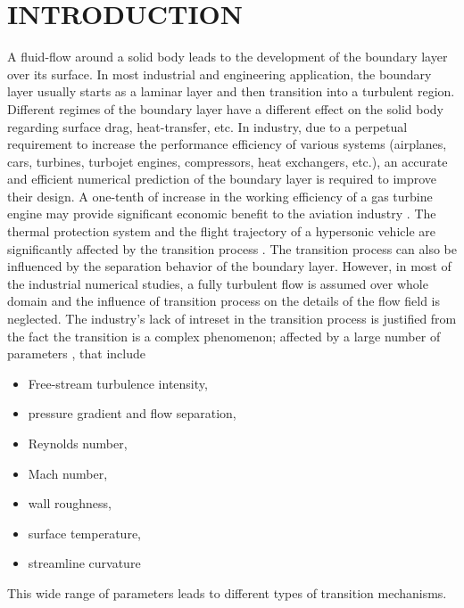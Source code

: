 
\chapter{INTRODUCTION}
\label{chap:intro}
A fluid-flow around a solid body leads to the development of the boundary layer over its surface.
In most industrial and engineering application, the boundary layer usually starts as a laminar layer and then transition into a turbulent region.
Different regimes of the boundary layer have a different effect on the solid body regarding surface drag, heat-transfer, etc. 
In industry, due to a perpetual requirement to increase the performance efficiency of various systems (airplanes, cars, turbines, turbojet engines, compressors, heat exchangers, etc.), an accurate and efficient numerical prediction of the boundary layer is required to improve their design.
A one-tenth of increase in the working efficiency of a gas turbine engine may provide significant economic benefit to the aviation industry \citep{1991Mayle}.
The thermal protection system and the flight trajectory of a hypersonic vehicle are significantly affected by the transition process \citep{1997hypersonic}.
The transition process can also be influenced by the separation behavior of the boundary layer.
However, in most of the industrial numerical studies, a fully turbulent flow is assumed over whole domain and the influence of transition process on the details of the flow field is neglected.
The industry's lack of intreset in the transition process is justified from the fact the transition is a complex phenomenon; affected by a large number of parameters \citep{1980Abu, 2006Menter}, that include
  \begin{itemize}
    \item Free-stream turbulence intensity,
    \item pressure gradient and flow separation,
    \item Reynolds number,
    \item Mach number,
    \item wall roughness,
    \item surface temperature,
    \item streamline curvature
  \end{itemize}
  This wide range of parameters leads to different types of transition mechanisms.
